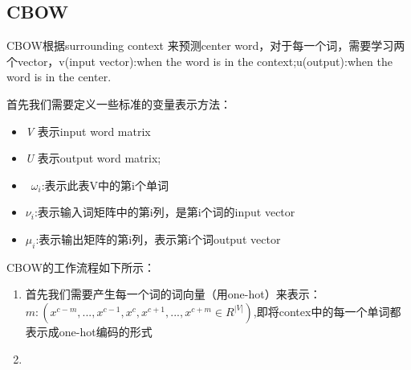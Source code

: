 	
	
	
	
	
	
		
	
	
	
	
	
	\subsection{CBOW}
	CBOW根据surrounding context 来预测center word，对于每一个词，需要学习两个vector，v(input vector):when the word is in the context;u(output):when the word is in the center.
	
	首先我们需要定义一些标准的变量表示方法：
	
	\begin{itemize}
		\item \emph{V} 表示input word matrix
		\item \emph{U} 表示output word matrix;
		\item \ $\omega _i$:表示此表V中的第i个单词
		\item $\nu_i$:表示输入词矩阵中的第i列，是第i个词的input vector
		\item $\mu_i$:表示输出矩阵的第i列，表示第i个词output vector
	
    \end{itemize}	
    
    CBOW的工作流程如下所示：
    \begin{enumerate}
    	\item 首先我们需要产生每一个词的词向量（用one-hot）来表示：$m:(x^{c-m},...,x^{c-1},x^{c},x^{c+1},...,x^{c+m} \in R^{|V|})$,即将contex中的每一个单词都表示成one-hot编码的形式
    	\item 
	\end{enumerate}
	
	
	
	
	
	
	
	
	
	
	
	
	
	
	
	
	
	
	
	
	
	
	
	
	
	
	
	
	    	
	
	